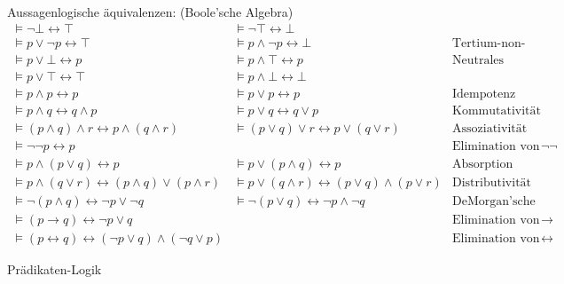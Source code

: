\documentclass{article}
\newcommand{\verum}{\top}
\newcommand{\falsum}{\bot}
\begin{document}
\noindent
{\large Aussagenlogische \"{a}quivalenzen: (Boole'sche Algebra)} \\[0.3cm]
\hspace*{0.3cm} 
$\begin{array}{lll}
\models \neg \falsum \leftrightarrow \verum & \models \neg \verum \leftrightarrow \falsum &  \\[0.1cm]
 \models p \vee   \neg p \leftrightarrow \verum & \models p \wedge \neg p \leftrightarrow \falsum & \mbox{Tertium-non-Datur} \\[0.1cm]
 \models p \vee   \falsum \leftrightarrow p & \models p \wedge \verum  \leftrightarrow p & \mbox{Neutrales Element}\\[0.1cm]
 \models p \vee   \verum  \leftrightarrow \verum & \models p \wedge \falsum \leftrightarrow \falsum &  \\[0.1cm]
 \models p \wedge p \leftrightarrow p  & \models p \vee p \leftrightarrow p &  \mbox{Idempotenz} \\[0.1cm]
 \models p \wedge q \leftrightarrow q \wedge p & \models p \vee   q \leftrightarrow q \vee p & \mbox{Kommutativit\"{a}t} \\[0.1cm]
 \models (p \wedge q) \wedge r \leftrightarrow p \wedge (q \wedge r) & \models (p \vee   q) \vee r \leftrightarrow p \vee   (q \vee r)  &
 \mbox{Assoziativit\"{a}t} \\[0.1cm]
 \models \neg \neg p \leftrightarrow p & & \mbox{Elimination von $\neg \neg$} \\[0.1cm]
 \models p \wedge (p \vee q)   \leftrightarrow p & \models p \vee   (p \wedge q) \leftrightarrow p &  \mbox{Absorption} \\[0.1cm]
 \models p \wedge (q \vee r)   \leftrightarrow (p \wedge q) \vee   (p \wedge r) & 
 \models p \vee   (q \wedge r) \leftrightarrow (p \vee q)   \wedge (p \vee   r) & \mbox{Distributivit\"{a}t} \\[0.1cm]
 \models \neg (p \wedge q) \leftrightarrow  \neg p \vee   \neg q &  \models \neg (p \vee   q) \leftrightarrow  \neg p \wedge \neg q &
 \mbox{DeMorgan'sche Regeln}  \\[0.1cm]
 \models (p \rightarrow q) \leftrightarrow \neg p \vee q & &  \mbox{Elimination von $\rightarrow$} \\[0.1cm]
 \models (p \leftrightarrow q) \leftrightarrow (\neg p \vee q) \wedge (\neg q \vee p) & & \mbox{Elimination von $\leftrightarrow$}
\end{array}$ \\[0.3cm]

\begin{center}
{\Large Pr\"{a}dikaten-Logik}
\end{center}
\end{document}
